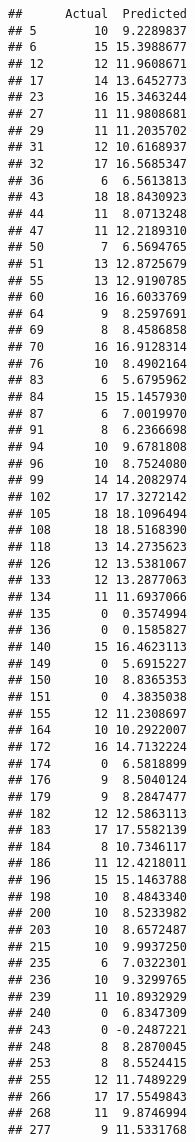 \documentclass[
]{article}
\newenvironment{Shaded}{\begin{snugshade}}{\end{snugshade}}
\newcommand{\KeywordTok}[1]{\textcolor[rgb]{0.13,0.29,0.53}{\textbf{#1}}}
\newcommand{\NormalTok}[1]{#1}
\newcommand{\OperatorTok}[1]{\textcolor[rgb]{0.81,0.36,0.00}{\textbf{#1}}}
\newcommand{\StringTok}[1]{\textcolor[rgb]{0.31,0.60,0.02}{#1}}
\begin{document}
\begin{Shaded}
\end{Shaded}

\begin{verbatim}
##      Actual  Predicted
## 5        10  9.2289837
## 6        15 15.3988677
## 12       12 11.9608671
## 17       14 13.6452773
## 23       16 15.3463244
## 27       11 11.9808681
## 29       11 11.2035702
## 31       12 10.6168937
## 32       17 16.5685347
## 36        6  6.5613813
## 43       18 18.8430923
## 44       11  8.0713248
## 47       11 12.2189310
## 50        7  6.5694765
## 51       13 12.8725679
## 55       13 12.9190785
## 60       16 16.6033769
## 64        9  8.2597691
## 69        8  8.4586858
## 70       16 16.9128314
## 76       10  8.4902164
## 83        6  5.6795962
## 84       15 15.1457930
## 87        6  7.0019970
## 91        8  6.2366698
## 94       10  9.6781808
## 96       10  8.7524080
## 99       14 14.2082974
## 102      17 17.3272142
## 105      18 18.1096494
## 108      18 18.5168390
## 118      13 14.2735623
## 126      12 13.5381067
## 133      12 13.2877063
## 134      11 11.6937066
## 135       0  0.3574994
## 136       0  0.1585827
## 140      15 16.4623113
## 149       0  5.6915227
## 150      10  8.8365353
## 151       0  4.3835038
## 155      12 11.2308697
## 164      10 10.2922007
## 172      16 14.7132224
## 174       0  6.5818899
## 176       9  8.5040124
## 179       9  8.2847477
## 182      12 12.5863113
## 183      17 17.5582139
## 184       8 10.7346117
## 186      11 12.4218011
## 196      15 15.1463788
## 198      10  8.4843340
## 200      10  8.5233982
## 203      10  8.6572487
## 215      10  9.9937250
## 235       6  7.0322301
## 236      10  9.3299765
## 239      11 10.8932929
## 240       0  6.8347309
## 243       0 -0.2487221
## 248       8  8.2870045
## 253       8  8.5524415
## 255      12 11.7489229
## 266      17 17.5549843
## 268      11  9.8746994
## 277       9 11.5331768

\end{verbatim}
\end{document}
